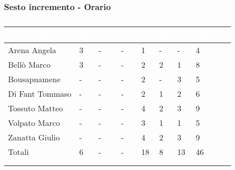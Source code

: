 {{            \subsubsection{Sesto incremento - Orario} {
                \setlength{\freewidth}{\dimexpr\textwidth-30\tabcolsep}
            \renewcommand{\arraystretch}{1.0}
            \setlength{\aboverulesep}{0pt}
            \setlength{\belowrulesep}{0pt}
            \begin{longtable}{C{.3\freewidth} C{.1\freewidth} C{.1\freewidth} C{.1\freewidth} C{.1\freewidth} C{.1\freewidth} C{.1\freewidth} C{.1\freewidth} C{.1\freewidth} C{.3\freewidth}}
            \toprule
            \textcolor{white}{\textbf{Componente}}&
            \textcolor{white}{\textbf{Re}}&
            \textcolor{white}{\textbf{Am}}&
            \textcolor{white}{\textbf{An}}&
            \textcolor{white}{\textbf{Pt}}&
            \textcolor{white}{\textbf{Pr}}&
            \textcolor{white}{\textbf{Ve}}&
            \textcolor{white}{\textbf{Ore}} \\
            \toprule
            \endhead
    
            Arena Angela & 3 & - & - & 1 & - & - & 4\\      
            Bellò Marco & 3 & - & - & 2 & 2 & 1 & 8\\      
            Bousapnamene & - & - & - & 2 & - & 3 & 5\\      
            Di Fant Tommaso & - & - & - & 2 & 1 & 2  & 6\\      
            Tossuto Matteo & - & - & - & 4 & 2 & 3  & 9\\      
            Volpato Marco & - & - & - & 3 & 1 & 1 &  5 \\      
            Zanatta Giulio & - & - & - & 4 & 2 & 3 & 9 \\      
            Totali & 6 & - & - & 18 & 8 & 13 & 46 \\
            \bottomrule
            \\
            \caption{}

            \end{longtable}
            }
}}
